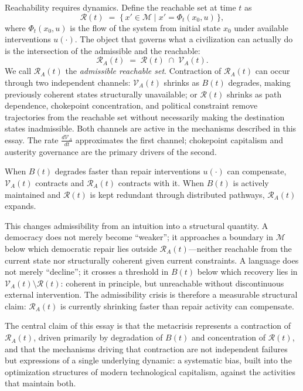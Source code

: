 \documentclass[11pt, letterpaper]{article}
\begin{document}
Reachability requires dynamics. Define the reachable set at time $t$ as
\[
  \mathcal{R}(t) \;=\; \bigl\{\,x' \in \mathcal{M} \;\big|\; x' = \Phi_t(x_0, u)\,\bigr\},
\]
where $\Phi_t(x_0, u)$ is the flow of the system from initial state $x_0$ under available interventions $u(\cdot)$. The object that governs what a civilization can actually do is the intersection of the admissible and the reachable:
\[
  \mathcal{R}_A(t) \;=\; \mathcal{R}(t) \;\cap\; \mathcal{V}_A(t).
\]
We call $\mathcal{R}_A(t)$ the \emph{admissible reachable set}. Contraction of $\mathcal{R}_A(t)$ can occur through two independent channels: $\mathcal{V}_A(t)$ shrinks as $B(t)$ degrades, making previously coherent states structurally unavailable; or $\mathcal{R}(t)$ shrinks as path dependence, chokepoint concentration, and political constraint remove trajectories from the reachable set without necessarily making the destination states inadmissible. Both channels are active in the mechanisms described in this essay. The rate $\frac{d\mathcal{V}_A}{dt}$ approximates the first channel; chokepoint capitalism and austerity governance are the primary drivers of the second.

When $B(t)$ degrades faster than repair interventions $u(\cdot)$ can compensate, $\mathcal{V}_A(t)$ contracts and $\mathcal{R}_A(t)$ contracts with it. When $B(t)$ is actively maintained and $\mathcal{R}(t)$ is kept redundant through distributed pathways, $\mathcal{R}_A(t)$ expands.

This changes admissibility from an intuition into a structural quantity. A democracy does not merely become ``weaker''; it approaches a boundary in $\mathcal{M}$ below which democratic repair lies outside $\mathcal{R}_A(t)$---neither reachable from the current state nor structurally coherent given current constraints. A language does not merely ``decline''; it crosses a threshold in $B(t)$ below which recovery lies in $\mathcal{V}_A(t) \setminus \mathcal{R}(t)$: coherent in principle, but unreachable without discontinuous external intervention. The admissibility crisis is therefore a measurable structural claim: $\mathcal{R}_A(t)$ is currently shrinking faster than repair activity can compensate.

The central claim of this essay is that the metacrisis represents a contraction of $\mathcal{R}_A(t)$, driven primarily by degradation of $B(t)$ and concentration of $\mathcal{R}(t)$, and that the mechanisms driving that contraction are not independent failures but expressions of a single underlying dynamic: a systematic bias, built into the optimization structures of modern technological capitalism, against the activities that maintain both.
\end{document}
